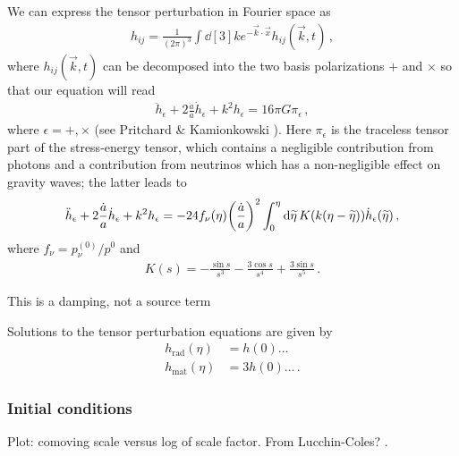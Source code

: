 \documentclass[main.tex]{subfiles}
\begin{document}
We can express the tensor perturbation in Fourier space as 
%
\begin{align}
h_{ij} = \frac{1}{(2\pi )^3} \int \dd[3]{k} e^{- \vec{k} \cdot \vec{x}}
h_{ij} (\vec{k}, t)
\,,
\end{align}
%
where \(h_{ij} (\vec{k}, t)\) can be decomposed into the two basis polarizations \(+\) and \(\times \)
so that our equation will read 
%
\begin{align}
\ddot{h}_{\epsilon } + 2 \frac{\dot{a}}{a} \dot{h}_{\epsilon } + k^2 h_{\epsilon } = 16 \pi G \pi_{\epsilon }
\,,
\end{align}
%
where \(\epsilon = +, \times \) (see Pritchard \& Kamionkowski \cite[]{pritchardCosmicMicrowaveBackground2005}). 
Here \(\pi_{\epsilon } \) is the traceless tensor part of the stress-energy tensor, which contains a negligible contribution from photons and a contribution from neutrinos which has a non-negligible effect on gravity waves; the latter leads to 
%
\begin{align}
\ddot{h}_{\epsilon } + 2 \frac{\dot{a}}{a} \dot{h}_{\epsilon }
+ k^2 h_{\epsilon } =
-24 f_{\nu }(\eta ) \qty(\frac{\dot{a}}{a})^2
\int_{0}^{\eta } \dd{\widetilde{\eta} } K (k (\eta - \widetilde{\eta})) \dot{h}_{\epsilon }(\widetilde{\eta})
\,,
\end{align}
%
where \(f_{\nu } = p_{\nu }^{(0)} / p^{0}\) and 
%
\begin{align}
K(s) = - \frac{\sin s}{s^3} - \frac{3 \cos s}{s^{4}}
+ \frac{3 \sin s}{s^{5}}
\,.
\end{align}

This is a damping, not a source term


Solutions to the tensor perturbation equations are given by 
%
\begin{subequations}
\begin{align}
h _{\text{rad}} (\eta ) &= h(0) \dots  \\
h _{\text{mat}} (\eta ) &= 3 h(0) \dots
\,.
\end{align}
\end{subequations}

\subsubsection{Initial conditions}

Plot: comoving scale versus log of scale factor. From Lucchin-Coles? \cite[]{colespCosmology2002}. 
\end{document}
